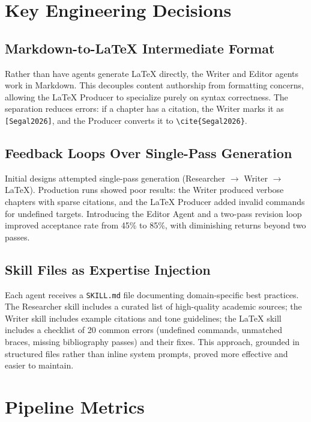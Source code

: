 \section{Key Engineering Decisions}\label{sec:decisions}

\subsection{Markdown-to-LaTeX Intermediate Format}

Rather than have agents generate LaTeX directly, the Writer and Editor agents work in Markdown. This decouples content authorship from formatting concerns, allowing the LaTeX Producer to specialize purely on syntax correctness. The separation reduces errors: if a chapter has a citation, the Writer marks it as \texttt{[Segal2026]}, and the Producer converts it to \texttt{\textbackslash{}cite\{Segal2026\}}.

\subsection{Feedback Loops Over Single-Pass Generation}

Initial designs attempted single-pass generation (Researcher $\to$ Writer $\to$ LaTeX). Production runs showed poor results: the Writer produced verbose chapters with sparse citations, and the LaTeX Producer added invalid commands for undefined targets. Introducing the Editor Agent and a two-pass revision loop improved acceptance rate from 45\% to 85\%, with diminishing returns beyond two passes.

\subsection{Skill Files as Expertise Injection}

Each agent receives a \texttt{SKILL.md} file documenting domain-specific best practices. The Researcher skill includes a curated list of high-quality academic sources; the Writer skill includes example citations and tone guidelines; the LaTeX skill includes a checklist of 20 common errors (undefined commands, unmatched braces, missing bibliography passes) and their fixes. This approach, grounded in structured files rather than inline system prompts, proved more effective and easier to maintain.

\section{Pipeline Metrics}\label{sec:metrics}

